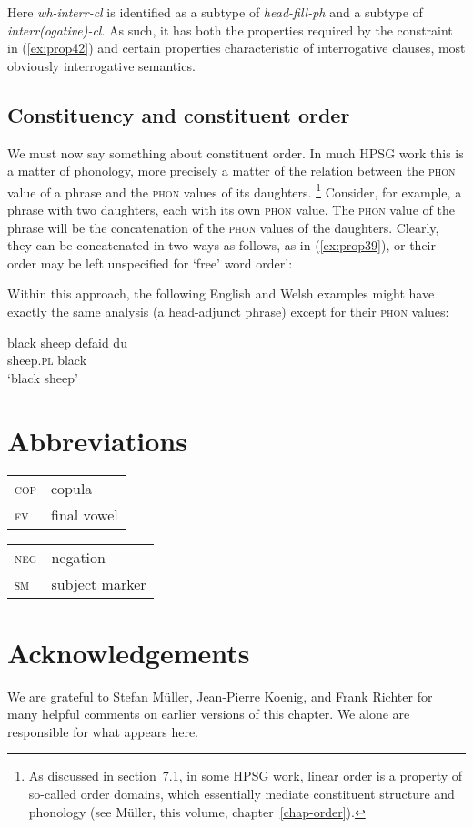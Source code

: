 \documentclass[output=paper
	        ,collection
	        ,collectionchapter
 	        ,biblatex
                ,babelshorthands
                ,newtxmath
                ,draftmode
                ,colorlinks, citecolor=brown
]{langscibook}
\begin{document}
Here \emph{wh-interr-cl} is identified as a subtype of \emph{head-fill-ph} and a subtype of \emph{interr(ogative)-cl}. As such, it has both the properties required by the constraint in (\ref{ex:prop42}) and certain properties characteristic of interrogative clauses, most obviously interrogative semantics.

\subsection{Constituency and constituent order}

We must now say something about constituent order. In much HPSG work this is a matter of phonology, more precisely a matter of the relation between the \textsc{phon} value of a phrase and the \textsc{phon} values of its daughters.%
%
\footnote{As discussed in section~7.1, in some HPSG work, linear order is a property of so-called order domains, which essentially mediate constituent structure and phonology (see Müller, this volume, chapter~\ref{chap-order}). }
%
Consider, for example, a phrase with two daughters, each with its own \textsc{phon} value. The \textsc{phon} value of the phrase will be the concatenation of the \textsc{phon} values of the daughters. Clearly, they can be concatenated in two ways as follows, as in (\ref{ex:prop39}), or their order may be left unspecified for ‘free’ word order’:

\ea\label{ex:prop39}
\z

Within this approach, the following English and Welsh examples might have exactly the same analysis (a head-adjunct phrase) except for their \textsc{phon} values:

\ea\label{ex:prop40}
	\ea\label{ex:prop40a}
	black sheep
	\ex\label{ex:prop40b}
	\gll defaid du\\
	sheep.\textsc{pl} black\\
	\glt ‘black sheep’
	\z
\z




\section*{Abbreviations}
\begin{tabularx}{.45\textwidth}{lX}
\textsc{cop} & copula\\ 
\textsc{fv} & final vowel\\
\end{tabularx}
\begin{tabularx}{.45\textwidth}{lX}
\textsc{neg} & negation\\ 
\textsc{sm} & subject marker\\
\end{tabularx}


\section*{Acknowledgements}

We are grateful to Stefan Müller, Jean-Pierre Koenig, and Frank Richter for many helpful comments on
earlier versions of this chapter. We alone are responsible for what appears here.



{\sloppy
\printbibliography[heading=subbibliography,notkeyword=this]
}
\end{document}
